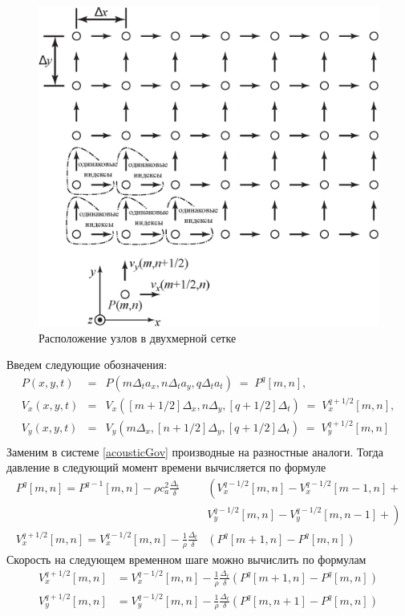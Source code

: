 \documentclass[a4paper, fontsize=14pt]{article}
\begin{document}
\begin{figure}[h]
	\centering
	\includegraphics[width=0.75\columnwidth]{acoustic-2d-grid-ru.eps}
	\caption{Расположение узлов в двухмерной сетке}
	\label{grid2d}
\end{figure}

Введем следующие обозначения:
\begin{eqnarray*}
P(x,y,t) & = & P(m\Delta_ta_x,n \Delta_ta_y,  q\Delta_ta_t) \;=\;
 P^q[m,n],\\
V_x(x,y,t) & = & 
  V_x\left([m+1/2]\Delta_x,n \Delta_y,  [q+1/2]\Delta_t\right)
  \;=\; V_x^{q+1/2}[m,n], \\
V_y(x,y,t) & = & 
  V_y\left(m\Delta_x,[n+1/2] \Delta_y,  [q+1/2]\Delta_t\right)
  \;=\; V_y^{q+1/2}[m,n] \\
\end{eqnarray*}
Заменим в системе \ref{acousticGov} производные на разностные аналоги. Тогда давление в следующий
момент времени вычисляется по формуле
\begin{align*}
P^q[m,n] = P^{q-1}[m,n] -
        \rho c_a^2 \frac{\Delta_t}{\delta}
	& \left( V_x^{q-1/2}[m,n]-V_x^{q-1/2}[m-1,n]+\mbox{}\right.\\
	& \left. V_y^{q-1/2}[m,n]-V_y^{q-1/2}[m,n-1]+\mbox{}\right)\\          
V_x^{q+1/2}[m,n] = V_x^{q-1/2}[m,n]
               -\frac{1}{\rho}\frac{\Delta_t}{\delta}
				& \left(P^q[m+1,n]-P^q[m,n]\right)
\end{align*}
Скорость на следующем временном шаге можно вычислить по формулам
\begin{align*}
	V_x^{q+1/2}[m,n] &= V_x^{q-1/2}[m,n]
               -\frac{1}{\rho}\frac{\Delta_t}{\delta}
                \left(P^q[m+1,n]-P^q[m,n]\right)\\
	V_y^{q+1/2}[m,n] &= V_y^{q-1/2}[m,n]
               -\frac{1}{\rho}\frac{\Delta_t}{\delta}
                \left(P^q[m,n+1]-P^q[m,n]\right)\\
\end{align*}
\end{document}
